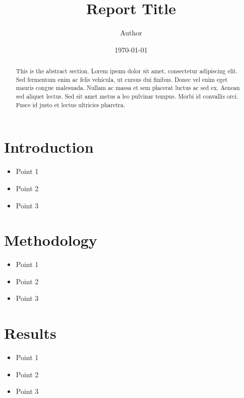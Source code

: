\documentclass{article}
\title{\textbf{\LARGE Report Title}}
\author{\Large Author}
\date{\Large \today}
\begin{document}
\maketitle

\begin{abstract}
This is the abstract section. Lorem ipsum dolor sit amet, consectetur adipiscing elit. Sed fermentum enim ac felis vehicula, ut cursus dui finibus. Donec vel enim eget mauris congue malesuada. Nullam ac massa et sem placerat luctus ac sed ex. Aenean sed aliquet lectus. Sed sit amet metus a leo pulvinar tempus. Morbi id convallis orci. Fusce id justo et lectus ultricies pharetra.
\end{abstract}

\section{Introduction}
\begin{keypoints}
\begin{itemize}
  \item Point 1
  \item Point 2
  \item Point 3
\end{itemize}
\end{keypoints}

\lipsum[1] %

\section{Methodology}
\begin{keypoints}
\begin{itemize}
  \item Point 1
  \item Point 2
  \item Point 3
\end{itemize}
\end{keypoints}

\lipsum[2] %

\section{Results}
\begin{keypoints}
\begin{itemize}
  \item Point 1
  \item Point 2
  \item Point 3
\end{itemize}
\end{keypoints}
\end{document}

